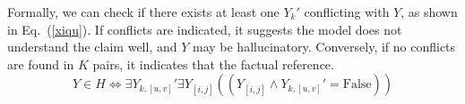 Formally, we can check if there exists at least one $Y_{k}'$ conflicting with $Y$, as shown in Eq.~(\ref{xiqu}). If conflicts are indicated, it suggests the model does not understand the claim well, and $Y$ may be hallucinatory. Conversely, if no conflicts are found in $K$ pairs, it indicates that the factual reference.
\begin{equation}\label{xiqu}
   Y \in H \Leftrightarrow \exists Y_{k,[u,v]}'\exists Y_{[i,j]}(( Y_{[i,j]}\land Y_{k,[u,v]}' = \text{False}))
\end{equation}






